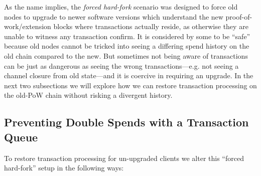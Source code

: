 As the name implies, the \emph{forced hard-fork} scenario was designed
to force old nodes to upgrade to newer software versions which
understand the new proof-of-work/extension blocks where transactions
actually reside, as otherwise they are unable to witness any
transaction confirm.  It is considered by some to be ``safe'' because
old nodes cannot be tricked into seeing a differing spend history on
the old chain compared to the new.  But sometimes not being aware of
transactions can be just as dangerous as seeing the wrong
transactions---e.g. not seeing a channel closure from old state---and
it is coercive in requiring an upgrade.  In the next two subsections
we will explore how we can restore transaction processing on the
old-PoW chain without risking a divergent history.

\subsection{Preventing Double Spends with a Transaction Queue} \label{transactionqueue}

To restore transaction processing for un-upgraded clients we alter
this ``forced hard-fork'' setup in the following ways:

